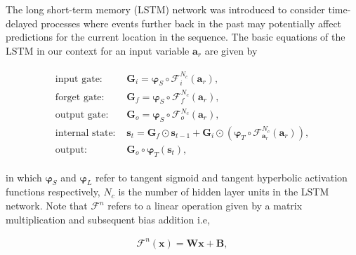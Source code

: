 \documentclass[preprint,12pt]{elsarticle}
\begin{document}
The long short-term memory (LSTM) network was introduced to consider time-delayed processes where events further back in the past may potentially affect predictions for the current location in the sequence. The basic equations of the LSTM in our context for an input variable $\mathbf{a}_r$ are given by
\begin{linenomath*}
\begin{align}
\begin{split}
\text{input gate: }& \boldsymbol{G}_{i}=\boldsymbol{\varphi}_{S} \circ \mathcal{F}_{i}^{N_{c}}(\mathbf{a}_r), \\
\text{forget gate: }& \boldsymbol{G}_{f}=\boldsymbol{\varphi}_{S} \circ \mathcal{F}_{f}^{N_{c}}(\mathbf{a}_r), \\
\text{output gate: }& \boldsymbol{G}_{o}=\boldsymbol{\varphi}_{S} \circ \mathcal{F}_{o}^{N_{c}}(\mathbf{a}_r), \\
\text{internal state: }& \boldsymbol{s}_{t}=\boldsymbol{G}_{f} \odot \boldsymbol{s}_{t-1}+\boldsymbol{G}_{i} \odot\left(\boldsymbol{\varphi}_{T} \circ \mathcal{F}_{\mathbf{a}_r}^{N_{c}}(\mathbf{a}_r)\right), \\
\text{output: }& \boldsymbol{G}_{o} \circ \boldsymbol{\varphi}_{T}\left(\boldsymbol{s}_{t}\right),
\end{split}
\end{align}
\end{linenomath*}
in which $\boldsymbol{\varphi}_{S}$ and $\boldsymbol{\varphi}_{L}$ refer to tangent sigmoid and tangent hyperbolic activation functions respectively, $N_c$ is the number of hidden layer units in the LSTM network. Note that $\mathcal{F}^{n}$ refers to a linear operation given by a matrix multiplication and subsequent bias addition i.e,
\begin{linenomath*}
\begin{align}
\mathcal{F}^{n}(\boldsymbol{x})=\boldsymbol{W} \boldsymbol{x}+\boldsymbol{B},
\end{align}
\end{linenomath*}
\end{document}
